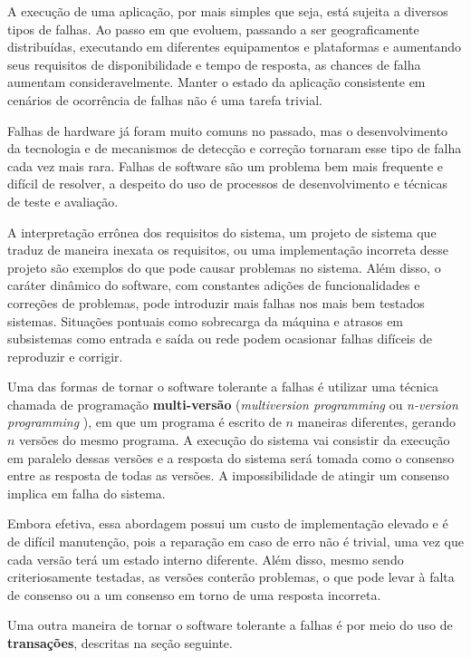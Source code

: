 \documentclass[11pt,twoside,a4paper]{book}
\begin{document}
A execução de uma aplicação, por mais simples que seja, está sujeita a diversos tipos de falhas. Ao passo em que evoluem, passando a ser geograficamente distribuídas, executando em diferentes equipamentos e plataformas e aumentando seus requisitos de disponibilidade e tempo de resposta, as chances de falha aumentam consideravelmente. Manter o estado da aplicação consistente em cenários de ocorrência de falhas não é uma tarefa trivial.

Falhas de hardware já foram muito comuns no passado, mas o desenvolvimento da tecnologia e de mecanismos de detecção e correção tornaram esse tipo de falha cada vez mais rara. Falhas de software são um problema bem mais frequente e difícil de resolver, a despeito do uso de processos de desenvolvimento e técnicas de teste e avaliação.

A interpretação errônea dos requisitos do sistema, um projeto de sistema que traduz de maneira inexata os requisitos, ou uma implementação incorreta desse projeto são exemplos do que pode causar problemas no sistema. Além disso, o caráter dinâmico do software, com constantes adições de funcionalidades e correções de problemas, pode introduzir mais falhas nos mais bem testados sistemas. Situações pontuais como sobrecarga da máquina e atrasos em subsistemas como entrada e saída ou rede podem ocasionar falhas difíceis de reproduzir e corrigir.

Uma das formas de tornar o software tolerante a falhas é utilizar uma técnica chamada de programação \textbf{multi-versão} (\emph{multiversion programming} ou \emph{n-version programming} \cite{n_version}), em que um programa é escrito de $n$ maneiras diferentes, gerando $n$ versões do mesmo programa. A execução do sistema vai consistir da execução em paralelo dessas versões e a resposta do sistema será tomada como o consenso entre as resposta de todas as versões. A impossibilidade de atingir um consenso implica em falha do sistema.

Embora efetiva, essa abordagem possui um custo de implementação elevado e é de difícil manutenção, pois a reparação em caso de erro não é trivial, uma vez que cada versão terá um estado interno diferente. Além disso, mesmo sendo criteriosamente testadas, as versões conterão problemas, o que pode levar à falta de consenso ou a um consenso em torno de uma resposta incorreta.

Uma outra maneira de tornar o software tolerante a falhas é por meio do uso de \textbf{transações}, descritas na seção seguinte.
\end{document}
